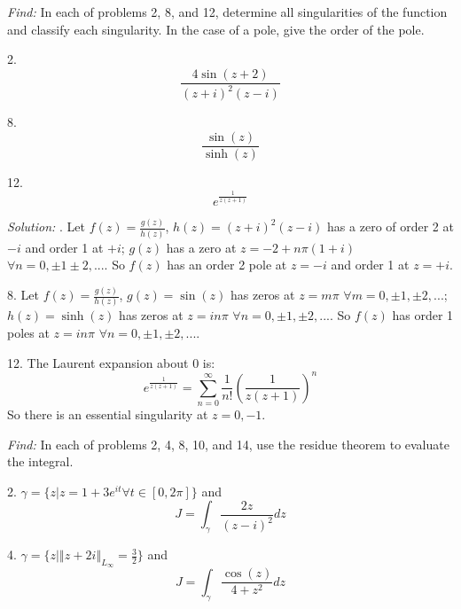 \documentclass[11pt]{homework}
\begin{document}
\maketitle

\emph{Find:}
\newline
In each of problems 2, 8, and 12,
determine all singularities of the function
and classify each singularity. 
In the case of a pole, give the order of the pole.

2.
\begin{equation*}
\frac{4 \sin( z+2)}{(z+i)^2 (z-i)}
\end{equation*}

8.
\begin{equation*}
\frac{\sin(z)}{\sinh(z)}
\end{equation*}

12.
\begin{equation*}
e^{\frac{1}{z(z+1)}}
\end{equation*}

\emph{Solution:}
. Let $f(z) =\frac{g(z)}{h(z)}$, 
$h(z)=(z+i)^2 (z-i)$ has 
a zero of order 2 at $-i$ and 
order 1 at $+i$;
$g(z)$ has a zero at $z = -2 + n\pi (1+i)$ $\forall n=0,\pm 1 \pm 2,...$.
So $f(z)$ has an order 2 pole at $z=-i$ and order 1 at $z=+i$.

8. Let $f(z) =\frac{g(z)}{h(z)}$, 
$g(z) = \sin(z)$ has zeros at $z=m\pi$ $\forall m=0,\pm 1, \pm 2, ...$;
$h(z) = \sinh(z)$ has zeros at $z=i n\pi$ $\forall n=0,\pm 1, \pm 2, ...$.
So $f(z)$ has order 1 poles at $z=i n\pi$ $\forall n=0,\pm 1, \pm 2, ...$.

12.  The Laurent expansion about 0 is:
\begin{equation*}
e^{\frac{1}{z(z+1)}} = \sum_{n=0}^{\infty} \frac{1}{n!} \left( \frac{1}{z(z+1)}\right)^n
\end{equation*}
So there is an essential singularity at $z=0,-1$.

\newpage
{}
\emph{Find:}
\newline
In each of problems 2, 4, 8, 10, and 14,
use the residue theorem to evaluate the integral.

2. $\gamma = \{z | z=1+3e^{it} \forall t\in[0,2\pi]\}$ and
\begin{equation*}
J = \int_\gamma \frac{2z}{(z-i)^2} dz
\end{equation*}

4. $\gamma = \{z |  \left\Vert z+2i \right\Vert_{L_\infty}=\frac{3}{2} \}$ and
\begin{equation*}
J = \int_\gamma \frac{\cos(z)}{4+z^2} dz
\end{equation*}
\end{document}
